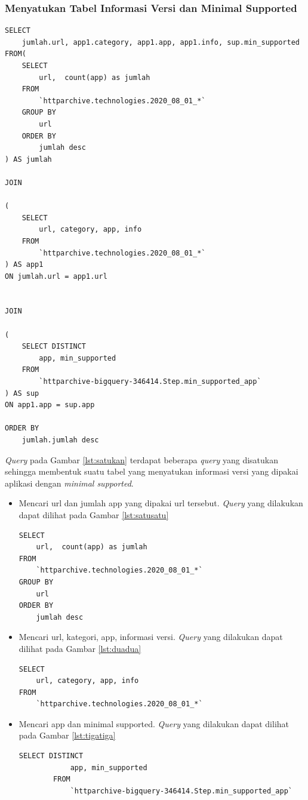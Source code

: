 \subsubsection{Menyatukan Tabel Informasi Versi dan Minimal Supported}
\begin{lstlisting}[label={lst:satukan}, caption={Menyatukan Tabel Informasi Versi dan Minimal Supported}]
SELECT 
	jumlah.url, app1.category, app1.app, app1.info, sup.min_supported
FROM(
	SELECT 
		url,  count(app) as jumlah
	FROM
	 	`httparchive.technologies.2020_08_01_*`
	GROUP BY 
		url
	ORDER BY 
		jumlah desc
) AS jumlah

JOIN 

(
	SELECT 
		url, category, app, info
	FROM 
		`httparchive.technologies.2020_08_01_*`
) AS app1
ON jumlah.url = app1.url


JOIN 

(
	SELECT DISTINCT 
		app, min_supported
	FROM 
		`httparchive-bigquery-346414.Step.min_supported_app`
) AS sup
ON app1.app = sup.app

ORDER BY 
	jumlah.jumlah desc
\end{lstlisting}
\textit{Query} pada Gambar \ref{lst:satukan} terdapat beberapa \textit{query} yang disatukan sehingga membentuk suatu tabel yang menyatukan informasi versi yang dipakai aplikasi dengan \textit{minimal supported}.
\begin{itemize}
	\item Mencari url dan jumlah app yang dipakai url tersebut. \textit{Query} yang dilakukan dapat dilihat pada Gambar \ref{lst:satusatu}
	\begin{lstlisting}[label={lst:satusatu}, caption={Mencari URL dan Jumlah APP yang Dipakai}]
SELECT 
	url,  count(app) as jumlah
FROM 
	`httparchive.technologies.2020_08_01_*`
GROUP BY 
	url
ORDER BY 
	jumlah desc
	\end{lstlisting}
	\item Mencari url, kategori, app, informasi versi. \textit{Query} yang dilakukan dapat dilihat pada Gambar \ref{lst:duadua}
	\begin{lstlisting}[label={lst:duadua}, caption={Mencari URL, Kategori, APP, dan Informasi Versi}]
SELECT
	url, category, app, info
FROM 
	`httparchive.technologies.2020_08_01_*`
	\end{lstlisting}
	\item Mencari app dan minimal supported. \textit{Query} yang dilakukan dapat dilihat pada Gambar \ref{lst:tigatiga}
	\begin{lstlisting}[label={lst:tigatiga}, caption={Mencari APP dan Minimal Supported}]
		SELECT DISTINCT
			app, min_supported
		FROM 
			`httparchive-bigquery-346414.Step.min_supported_app`
	\end{lstlisting}
\end{itemize}
